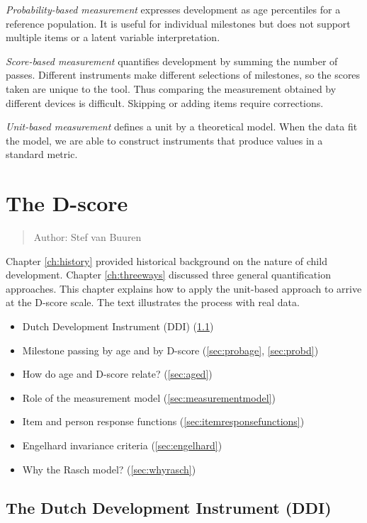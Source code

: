 \documentclass[
]{book}
\providecommand{\tightlist}{%
  \setlength{\itemsep}{0pt}\setlength{\parskip}{0pt}}
\begin{document}
\emph{Probability-based measurement} expresses development as age percentiles for a reference population. It is useful for individual milestones but does not support multiple items or a latent variable interpretation.

\emph{Score-based measurement} quantifies development by summing the number of passes. Different instruments make different selections of milestones, so the scores taken are unique to the tool. Thus comparing the measurement obtained by different devices is difficult. Skipping or adding items require corrections.

\emph{Unit-based measurement} defines a unit by a theoretical model. When the data fit the model, we are able to construct instruments that produce values in a standard metric.

\hypertarget{ch:newmodel}{%
\chapter{The D-score}\label{ch:newmodel}}

\begin{quote}
Author: Stef van Buuren
\end{quote}

Chapter \ref{ch:history} provided historical background on the nature of child development. Chapter \ref{ch:threeways} discussed three general quantification approaches. This chapter explains how to apply the unit-based approach to arrive at the D-score scale. The text illustrates the process with real data.

\begin{itemize}
\tightlist
\item
  Dutch Development Instrument (DDI) (\ref{sec:ddi})
\item
  Milestone passing by age and by D-score (\ref{sec:probage}, \ref{sec:probd})
\item
  How do age and D-score relate? (\ref{sec:aged})
\item
  Role of the measurement model (\ref{sec:measurementmodel})
\item
  Item and person response functions (\ref{sec:itemresponsefunctions})
\item
  Engelhard invariance criteria (\ref{sec:engelhard})
\item
  Why the Rasch model? (\ref{sec:whyrasch})
\end{itemize}

\hypertarget{sec:ddi}{%
\section{The Dutch Development Instrument (DDI)}\label{sec:ddi}}
\end{document}
